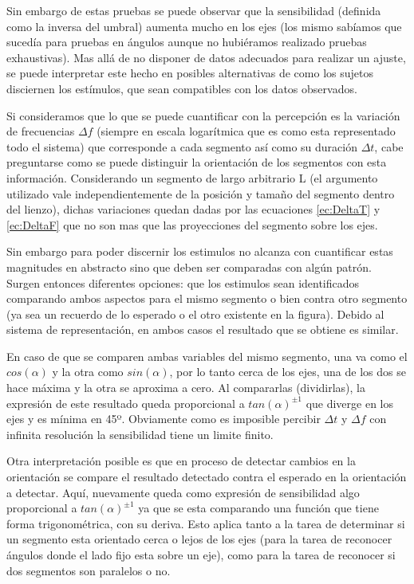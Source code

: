 \documentclass{article}
\begin{document}
    
    Sin embargo de estas pruebas se puede observar que la sensibilidad (definida como la inversa del umbral) aumenta mucho en los ejes (los mismo sabíamos que sucedía para pruebas en ángulos aunque no hubiéramos realizado pruebas exhaustivas). Mas allá de no disponer de datos adecuados para realizar un ajuste, se puede interpretar este hecho en posibles alternativas de como los sujetos disciernen los estímulos, que sean compatibles con los datos observados. 
    
    Si consideramos que lo que se puede cuantificar con la percepción es la variación de frecuencias $\Delta f$ (siempre en escala logarítmica que es como esta representado todo el sistema) que corresponde a cada segmento así como su duración $\Delta t$, cabe preguntarse como se puede distinguir la orientación de los segmentos con esta información. Considerando un segmento de largo arbitrario L (el argumento utilizado vale independientemente de la posición y tamaño del segmento dentro del lienzo), dichas variaciones quedan dadas por las ecuaciones \ref{ec:DeltaT} y \ref{ec:DeltaF} que no son mas que las proyecciones del segmento sobre los ejes.
    
    Sin embargo para poder discernir los estimulos no alcanza con cuantificar estas magnitudes en abstracto sino que deben ser comparadas con algún patrón. Surgen entonces diferentes opciones: que los estimulos sean identificados comparando ambos aspectos para el mismo segmento o bien contra otro segmento (ya sea un recuerdo de lo esperado o el otro existente en la figura). Debido al sistema de representación, en ambos casos el resultado que se obtiene es similar. 
    
    En caso de que se comparen ambas variables del mismo segmento, una va como el $cos(\alpha)$ y la otra como $sin(\alpha)$, por lo tanto cerca de los ejes, una de los dos se hace máxima y la otra se aproxima a cero. Al compararlas (dividirlas), la expresión de este resultado queda proporcional a $tan (\alpha)^{\pm1}$ que diverge en los ejes y es mínima en 45º. Obviamente como es imposible percibir $\Delta t$ y $\Delta f$ con infinita resolución la sensibilidad tiene un limite finito. 
    
    Otra interpretación posible es que en proceso de detectar cambios en la orientación se compare el resultado detectado contra el esperado en la orientación a detectar. Aquí, nuevamente queda como expresión de sensibilidad algo proporcional a $tan (\alpha)^{\pm1}$ ya que se esta comparando una función que tiene forma trigonométrica, con su deriva. Esto aplica tanto a la tarea de determinar si un segmento esta orientado cerca o lejos de los ejes (para la tarea de reconocer ángulos donde el lado fijo esta sobre un eje), como para la tarea de reconocer si dos segmentos son paralelos o no. 
    
\end{document}
